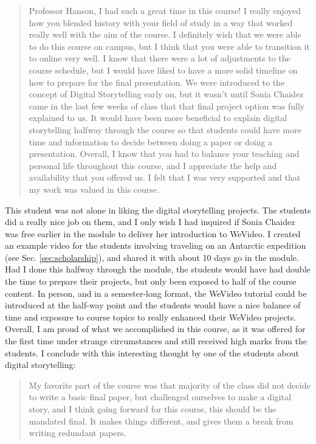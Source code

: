 \documentclass[../../../main.tex]{subfiles}
\begin{document}
\begin{quote}
Professor Hanson, I had such a great time in this course! I really enjoyed how you blended history with your field of study in a way that worked really well with the aim of the course. I definitely wish that we were able to do this course on campus, but I think that you were able to transition it to online very well. I know that there were a lot of adjustments to the course schedule, but I would have liked to have a more solid timeline on how to prepare for the final presentation. We were introduced to the concept of Digital Storytelling early on, but it wasn't until Sonia Chaidez came in the last few weeks of class that that final project option was fully explained to us. It would have been more beneficial to explain digital storytelling halfway through the course so that students could have more time and information to decide between doing a paper or doing a presentation. Overall, I know that you had to balance your teaching and personal life throughout this course, and I appreciate the help and availability that you offered us. I felt that I was very supported and that my work was valued in this course.
\end{quote}

This student was not alone in liking the digital storytelling projects.  The students did a really nice job on them, and I only wish I had inquired if Sonia Chaidez was free earlier in the module to deliver her introduction to WeVideo.  I created an example video for the students involving traveling on an Antarctic expedition (see Sec. \ref{sec:scholarship}), and shared it with about 10 days go in the module.  Had I done this halfway through the module, the students would have had double the time to prepare their projects, but only been exposed to half of the course content.  In person, and in a semester-long format, the WeVideo tutorial could be introduced at the half-way point and the students would have a nice balance of time and exposure to course topics to really enhanced their WeVideo projects.  Overall, I am proud of what we accomplished in this course, as it was offered for the first time under strange circumstances and still received high marks from the students.  I conclude with this interesting thought by one of the students about digital storytelling:

\begin{quote}
My favorite part of the course was that majority of the class did not decide to write a basic final paper, but challenged ourselves to
make a digital story, and I think going forward for this course, this should be the mandated final. It makes things different, and gives them a break from writing redundant papers.
\end{quote}
\end{document}
